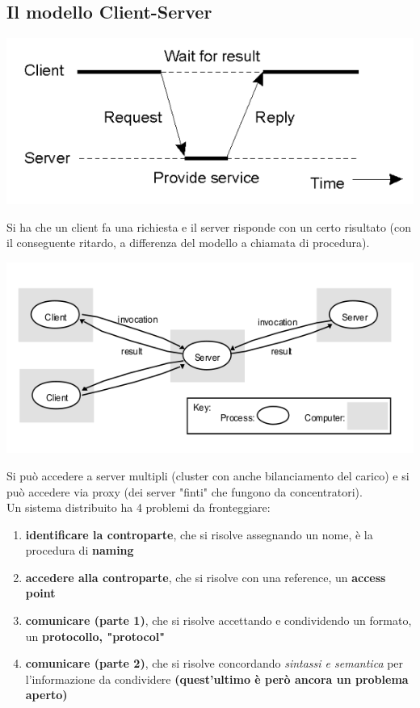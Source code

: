 \documentclass[a4paper,12pt, oneside]{book}
\begin{document}
\subsection{Il modello Client-Server}
\begin{center}
	\includegraphics[scale=0.6]{img/cli2.png}
\end{center}
Si ha che un client fa una richiesta e il server risponde con un certo risultato (con il conseguente ritardo, a differenza del modello a chiamata di procedura).
\begin{center}
	\includegraphics[scale=2.6]{img/cli3.png}
\end{center}
Si può accedere a server multipli (cluster con anche bilanciamento del carico) e si può accedere via proxy (dei server "finti" che fungono da concentratori).\\
Un sistema distribuito ha 4 problemi da fronteggiare:
\begin{enumerate}
	\item \textbf{identificare la controparte}, che si risolve assegnando un nome, è la procedura di \textbf{naming}
	\item \textbf{accedere alla controparte}, che si risolve con una reference, un \textbf{access point}
	\item \textbf{comunicare (parte 1)}, che si risolve accettando e condividendo un formato, un \textbf{protocollo, "protocol"}
	\item \textbf{comunicare (parte 2)}, che si risolve concordando \textit{sintassi e semantica} per l'informazione da condividere \textbf{(quest'ultimo è però ancora un problema aperto)}
\end{enumerate}
\end{document}
